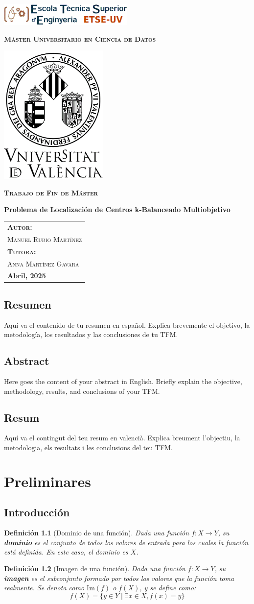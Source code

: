 \documentclass[12pt,a4paper]{book}
\newtheorem{defi}{Definición}[section]
\newcommand{\nuevaportada}[6]{
    \thispagestyle{empty}
    \begin{center}
        \includegraphics[width=0.5\textwidth]{images/logo.png}
        
        \vspace{0.3cm} %
        {\Large\bfseries\textsc{M\'aster Universitario en #1}\par}
        
        \vspace{0.3cm} %
        \includegraphics[width=0.4\textwidth]{images/uv.png}
        
        \vspace{0.3cm} %
        {\Large\bfseries\textsc{Trabajo de Fin de M\'aster}\par}
        
        \vspace{0.5cm} %
        {\Large\bfseries #2\par}
        
        \vspace{1.5cm} %
        \begin{flushright}
            \begin{tabular}{l} 
                {\large\bfseries\textsc{Autor:}} \\
                {\large\textsc{#3}} \\ [0.3cm] %
                {\large\bfseries\textsc{Tutora:}} \\ 
                {\large\textsc{#4}} \\ [0.3cm] %
                {\large\bfseries #5} 
            \end{tabular}
        \end{flushright}
    \end{center}
}
\begin{document}
\nuevaportada{Ciencia de Datos}{Problema de Localización de Centros k-Balanceado Multiobjetivo}{Manuel Rubio Martínez}{Anna Martínez Gavara}{Abril, 2025}

\clearpage

\newpage
\tableofcontents

\section*{Resumen}
Aquí va el contenido de tu resumen en español. Explica brevemente el objetivo, la metodología, los resultados y las conclusiones de tu TFM.

\newpage

\section*{Abstract}
Here goes the content of your abstract in English. Briefly explain the objective, methodology, results, and conclusions of your TFM.

\newpage

\section*{Resum}
Aquí va el contingut del teu resum en valencià. Explica breument l'objectiu, la metodologia, els resultats i les conclusions del teu TFM.

\newpage

\chapter{Preliminares}
\section{Introducción}
\begin{defi}[Dominio de una función]
Dada una función $f: X \to Y$, su \textbf{dominio} es el conjunto de todos los valores de entrada para los cuales la función está definida. En este caso, el dominio es $X$.
\end{defi}

\begin{defi}[Imagen de una función]
Dada una función $f: X \to Y$, su \textbf{imagen} es el subconjunto formado por todos los valores que la función toma realmente. Se denota como $\text{Im}(f)$ o $f(X)$, y se define como:
$$ f(X) = \{y \in Y \mid \exists x \in X, f(x) = y \} $$
\end{defi}
\end{document}
